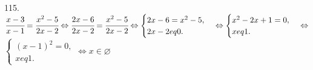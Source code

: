 115. $\cfrac{x-3}{x-1}=\cfrac{x^2-5}{2x-2}\Leftrightarrow \cfrac{2x-6}{2x-2}=\cfrac{x^2-5}{2x-2}\Leftrightarrow
\begin{cases} 2x-6=x^2-5,\\ 2x-2
eq0.\end{cases}\Leftrightarrow
\begin{cases} x^2-2x+1=0,\\ x
eq1.\end{cases}\Leftrightarrow$\\$
\begin{cases} (x-1)^2=0,\\ x
eq1.\end{cases}\Leftrightarrow x\in \varnothing$\\
